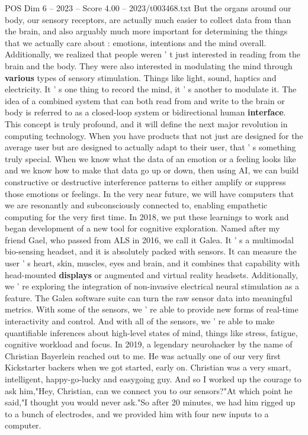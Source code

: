 \begin{textsample}{POS Dim 6 – 2023 – Score 4.00 – 2023/t003468.txt}
But the organs around our body, our sensory receptors, are actually much easier to collect data from than the brain, and also arguably much more important for determining the things that we actually care about : emotions, intentions and the mind overall.
Additionally, we realized that people weren ' t just interested in reading from the brain and the body.
They were also interested in modulating the mind through \textbf{various} types of sensory stimulation.
Things like light, sound, haptics and electricity.
It ' s one thing to record the mind, it ' s another to modulate it.
The idea of a combined system that can both read from and write to the brain or body is referred to as a closed-loop system or bidirectional human \textbf{interface}.
This concept is truly profound, and it will define the next major revolution in computing technology.
When you have products that not just are designed for the average user but are designed to actually adapt to their user, that ' s something truly special.
When we know what the data of an emotion or a feeling looks like and we know how to make that data go up or down, then using AI, we can build constructive or destructive interference patterns to either amplify or suppress those emotions or feelings.
In the very near future, we will have computers that we are resonantly and subconsciously connected to, enabling empathetic computing for the very first time.
In 2018, we put these learnings to work and began development of a new tool for cognitive exploration.
Named after my friend Gael, who passed from ALS in 2016, we call it Galea.
It ' s a multimodal bio-sensing headset, and it is absolutely packed with sensors.
It can measure the user ' s heart, skin, muscles, eyes and brain, and it combines that capability with head-mounted \textbf{displays} or augmented and virtual reality headsets.
Additionally, we ' re exploring the integration of non-invasive electrical neural stimulation as a feature.
The Galea software suite can turn the raw sensor data into meaningful metrics.
With some of the sensors, we ' re able to provide new forms of real-time interactivity and control.
And with all of the sensors, we ' re able to make quantifiable inferences about high-level states of mind, things like stress, fatigue, cognitive workload and focus.
In 2019, a legendary neurohacker by the name of Christian Bayerlein reached out to me.
He was actually one of our very first Kickstarter backers when we got started, early on.
Christian was a very smart, intelligent, happy-go-lucky and easygoing guy.
And so I worked up the courage to ask him,"Hey, Christian, can we connect you to our sensors?"At which point he said,"I thought you would never ask."So after 20 minutes, we had him rigged up to a bunch of electrodes, and we provided him with four new inputs to a computer.

\end{textsample}

